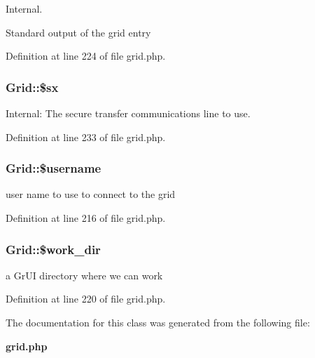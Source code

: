 Internal. 

Standard output of the grid entry 

Definition at line 224 of file grid.php.
\subsubsection{\setlength{\rightskip}{0pt plus 5cm}Grid::\$sx}\label{classGrid_o13}


Internal: The secure transfer communications line to use. 



Definition at line 233 of file grid.php.
\subsubsection{\setlength{\rightskip}{0pt plus 5cm}Grid::\$username}\label{classGrid_o1}


user name to use to connect to the grid 



Definition at line 216 of file grid.php.
\subsubsection{\setlength{\rightskip}{0pt plus 5cm}Grid::\$work\_\-dir}\label{classGrid_o5}


a Gr\-UI directory where we can work 



Definition at line 220 of file grid.php.

The documentation for this class was generated from the following file:\begin{CompactItemize}
\item 
{\bf grid.php}\end{CompactItemize}
